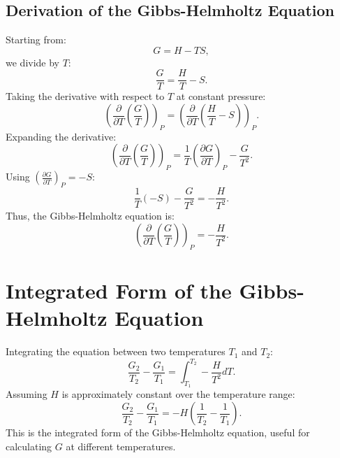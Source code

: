 \documentclass{article}
\theoremstyle{definition}
\begin{document}
\subsection{Derivation of the Gibbs-Helmholtz Equation}
Starting from:
\begin{equation}
    G = H - TS,
\end{equation}
we divide by \( T \):
\begin{equation}
    \frac{G}{T} = \frac{H}{T} - S.
\end{equation}
Taking the derivative with respect to \( T \) at constant pressure:
\begin{equation}
    \left( \frac{\partial}{\partial T} \left( \frac{G}{T} \right) \right)_P = \left( \frac{\partial}{\partial T} \left( \frac{H}{T} - S \right) \right)_P.
\end{equation}
Expanding the derivative:
\begin{equation}
    \left( \frac{\partial}{\partial T} \left( \frac{G}{T} \right) \right)_P = \frac{1}{T} \left( \frac{\partial G}{\partial T} \right)_P - \frac{G}{T^2}.
\end{equation}
Using \( \left(\frac{\partial G}{\partial T} \right)_P = -S \):
\begin{equation}
    \frac{1}{T} (-S) - \frac{G}{T^2} = -\frac{H}{T^2}.
\end{equation}
Thus, the Gibbs-Helmholtz equation is:
\begin{equation}
    \left( \frac{\partial}{\partial T} \left( \frac{G}{T} \right) \right)_P = -\frac{H}{T^2}.
\end{equation}

\section*{Integrated Form of the Gibbs-Helmholtz Equation}
Integrating the equation between two temperatures \( T_1 \) and \( T_2 \):
\begin{equation}
    \frac{G_2}{T_2} - \frac{G_1}{T_1} = \int_{T_1}^{T_2} -\frac{H}{T^2} dT.
\end{equation}
Assuming \( H \) is approximately constant over the temperature range:
\begin{equation}
    \frac{G_2}{T_2} - \frac{G_1}{T_1} = -H \left( \frac{1}{T_2} - \frac{1}{T_1} \right).
\end{equation}
This is the integrated form of the Gibbs-Helmholtz equation, useful for calculating \( G \) at different temperatures.
\end{document}
